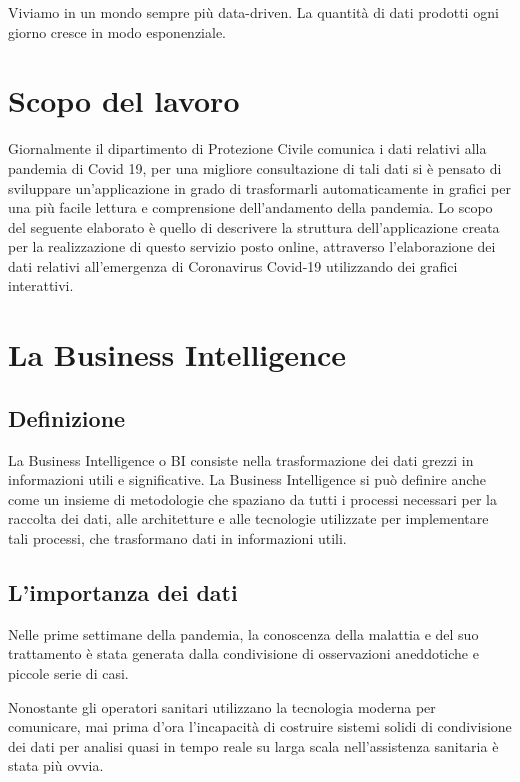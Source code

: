 \setlength{\parskip}{1em}


Viviamo in un mondo sempre più data-driven. La quantità di dati prodotti ogni giorno cresce in modo esponenziale.

\section{Scopo del lavoro}

Giornalmente il dipartimento di Protezione Civile comunica i dati relativi alla pandemia di Covid 19, per una migliore consultazione di tali dati si è pensato di sviluppare un’applicazione in grado di trasformarli automaticamente in grafici per una più facile lettura e comprensione dell’andamento della pandemia.
Lo scopo del seguente elaborato è quello di descrivere la struttura dell'applicazione creata per la realizzazione di questo servizio posto online, attraverso l’elaborazione dei dati relativi all’emergenza di Coronavirus Covid-19 utilizzando dei grafici interattivi.

\section{La Business Intelligence}
\subsection{Definizione}
La Business Intelligence o BI consiste nella trasformazione dei dati grezzi in informazioni utili e significative.
La Business Intelligence si può definire anche come un insieme di metodologie che spaziano da tutti i processi necessari per la raccolta dei dati, alle architetture e alle tecnologie  utilizzate per implementare tali processi, che trasformano dati in informazioni utili.

\subsection{L'importanza dei dati}
Nelle prime settimane della pandemia, la conoscenza della malattia e del suo trattamento è stata generata dalla condivisione di osservazioni aneddotiche e piccole serie di casi.

\noindent Nonostante gli operatori sanitari utilizzano la tecnologia moderna per comunicare, mai prima d'ora l'incapacità di costruire sistemi solidi di condivisione dei dati per analisi quasi in tempo reale su larga scala nell'assistenza sanitaria è stata più ovvia.

